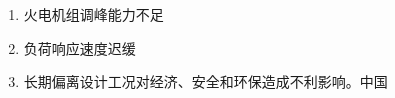 

%
%

%
%

\begin{enumerate}
	\item 火电机组调峰能力不足
	\item 负荷响应速度迟缓
	\item 长期偏离设计工况对经济、安全和环保造成不利影响。中国
\end{enumerate}


